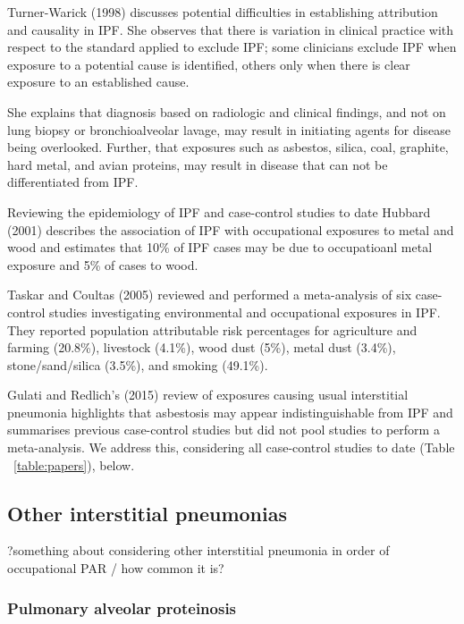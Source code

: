 \documentclass[a4paper,12pt]{article}
\begin{document}
Turner-Warick (1998)\cite{Turner-Warwick1998} discusses potential difficulties in establishing attribution and causality in IPF. She observes that there is variation in clinical practice with respect to the standard applied to exclude IPF; some clinicians exclude IPF when exposure to a potential cause is identified, others only when there is clear exposure to an established cause. 

She explains that diagnosis based on radiologic and clinical findings, and not on lung biopsy or bronchioalveolar lavage, may result in initiating agents for disease being overlooked. Further, that exposures such as asbestos, silica, coal, graphite, hard metal, and avian proteins, may result in disease that can not be differentiated from IPF.    

Reviewing the epidemiology of IPF and case-control studies to date Hubbard (2001)\cite{Hubbard2001} describes the association of IPF with occupational exposures to metal and wood and estimates that 10\% of IPF cases may be due to occupatioanl metal exposure and 5\% of cases to wood.    

Taskar and Coultas (2005)\cite{Taskar2006} reviewed and performed a meta-analysis of six case-control studies investigating environmental and occupational exposures in IPF. They reported population attributable risk percentages for agriculture and farming (20.8\%), livestock (4.1\%), wood dust (5\%), metal dust (3.4\%), stone/sand/silica (3.5\%), and smoking (49.1\%).

Gulati and Redlich's (2015)\cite{Gulati2015} review of exposures causing usual interstitial pneumonia highlights that asbestosis may appear indistinguishable from IPF and summarises previous case-control studies but did not pool studies to perform a meta-analysis. We address this, considering all case-control studies to date (Table ~\ref{table:papers}), below.  

\subsection{Other interstitial pneumonias}

?something about considering other interstitial pneumonia in order of occupational PAR / how common it is?

\subsubsection{Pulmonary alveolar proteinosis}
\end{document}
